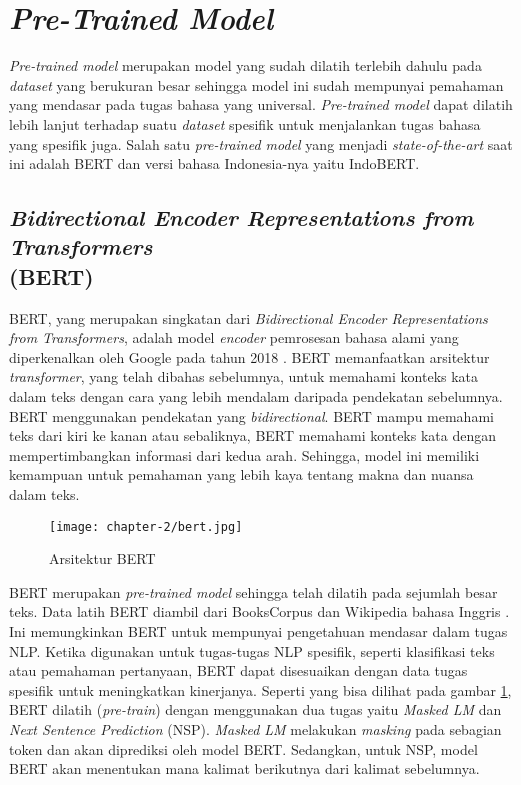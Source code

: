 \section{\textit{Pre-Trained Model}}

\textit{Pre-trained model} merupakan model yang sudah dilatih terlebih dahulu pada \textit{dataset} yang berukuran besar sehingga model ini sudah mempunyai pemahaman yang mendasar pada tugas bahasa yang universal. \textit{Pre-trained model} dapat dilatih lebih lanjut terhadap suatu \textit{dataset} spesifik untuk menjalankan tugas bahasa yang spesifik juga. Salah satu \textit{pre-trained model} yang menjadi \textit{state-of-the-art} saat ini adalah BERT dan versi bahasa Indonesia-nya yaitu IndoBERT. 

\subsection{\textit{Bidirectional Encoder Representations from Transformers} \\ (BERT)}

BERT, yang merupakan singkatan dari \textit{Bidirectional Encoder Representations from Transformers}, adalah model \textit{encoder} pemrosesan bahasa alami yang diperkenalkan oleh Google pada tahun 2018 \parencite{bert}. BERT memanfaatkan arsitektur \textit{transformer}, yang telah dibahas sebelumnya, untuk memahami konteks kata dalam teks dengan cara yang lebih mendalam daripada pendekatan sebelumnya. BERT menggunakan pendekatan yang \textit{bidirectional}. BERT mampu memahami teks dari kiri ke kanan atau sebaliknya, BERT memahami konteks kata dengan mempertimbangkan informasi dari kedua arah. Sehingga, model ini memiliki kemampuan untuk pemahaman yang lebih kaya tentang makna dan nuansa dalam teks.

\begin{figure}[ht]
    \vspace{0.25cm}
    \centering
    \texttt{[image: chapter-2/bert.jpg]}
    \caption{Arsitektur BERT \parencite{bert}}
    \label{fig:bert}
\end{figure}

BERT merupakan \textit{pre-trained model} sehingga telah dilatih pada sejumlah besar teks. Data latih BERT diambil dari BooksCorpus dan Wikipedia bahasa Inggris \parencite{bert}. Ini memungkinkan BERT untuk mempunyai pengetahuan mendasar dalam tugas NLP. Ketika digunakan untuk tugas-tugas NLP spesifik, seperti klasifikasi teks atau pemahaman pertanyaan, BERT dapat disesuaikan dengan data tugas spesifik untuk meningkatkan kinerjanya. Seperti yang bisa dilihat pada gambar \ref{fig:bert}, BERT dilatih (\textit{pre-train}) dengan menggunakan dua tugas yaitu \textit{Masked LM} dan \textit{Next Sentence Prediction} (NSP). \textit{Masked LM} melakukan \textit{masking} pada sebagian token dan akan diprediksi oleh model BERT. Sedangkan, untuk NSP, model BERT akan menentukan mana kalimat berikutnya dari kalimat sebelumnya.


